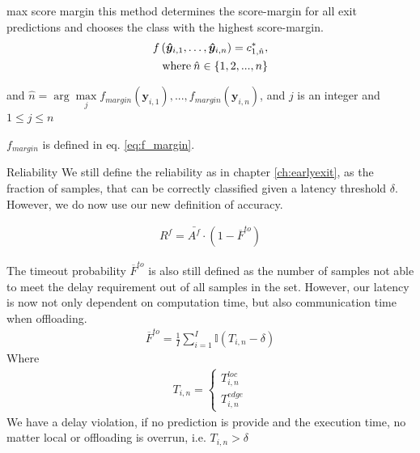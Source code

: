 \begin{enumdescript}
\begin{enumdescript}
			
			\item[max score margin] this method determines the score-margin for all exit predictions and chooses the class with the highest score-margin. 
			\begin{align}
			\begin{split}
			f\left(\bm{\hat{y}}_{i,1}, \dots, \bm{\hat{y}}_{i,n} \right) =c^*_{1,\hat{n}},\\
			\text{where\:} \hat{n} \in \{1, 2, ..., n\}
			\end{split}	
			\end{align}
			
			and $ \hat{n} = \arg \underset{j}{\max} {f_{margin}(\bm{y}_{i,1}), ..., f_{margin}(\bm{y}_{i,n}) } $, 
			and $ j $ is an integer and $ 1 \le j \le n $
			
			$ f_{margin} $ is defined in eq. \ref{eq:f_margin}.
		\end{enumdescript}
	
		\item[Reliability]  We still define the reliability as in chapter \ref{ch:earlyexit}, as the fraction of samples, that can be correctly classified given a latency threshold $ \delta $. However, we do now use our new definition of accuracy.
		
		\begin{align}
		R^f= \bar{A^f} \cdot (1-\overline{F}^{to})
		\end{align}
		
		The timeout probability $ \overline{F}^{to} $ is also still defined as the number of samples not able to meet the delay requirement out of all samples in the set. However, our latency is now not only dependent on computation time, but also communication time when offloading.
		\begin{align}
		\overline{F}^{to}=\frac{1}{I}\sum_{i=1}^{I} \mathbb{I}\left(T_{i,n}-\delta\right)
		\end{align}
		Where
		\begin{align}
			T_{i,n} = \begin{cases}
				T_{i,n}^{loc} \\
				T_{i,n}^{edge}
			\end{cases}
		\end{align}
		We have a delay violation, if no prediction is provide and the execution time, no matter local or offloading is overrun, i.e. $ T_{i,n} > \delta $  
	

\end{enumdescript}
